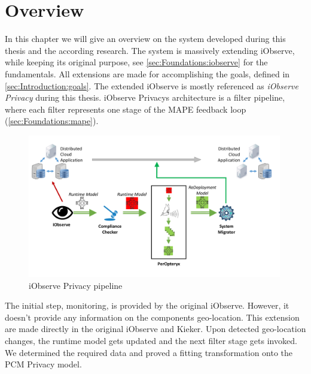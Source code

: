 
\chapter{Overview}
\label{ch:Overview}

In this chapter we will give an overview on the system developed during this thesis and the according research. The system is massively extending iObserve, while keeping its original purpose, see \autoref{sec:Foundations:iobserve} for the fundamentals. All extensions are made for accomplishing the goals, defined in \autoref{sec:Introduction:goals}. The extended iObserve is mostly referenced as \textit{iObserve Privacy} during this thesis. iObserve Privacys architecture is a filter pipeline, where each filter represents one stage of the MAPE feedback loop (\autoref{sec:Foundations:mape}).


\begin{figure}[h]
	\centering
	\includegraphics[width=0.99\textwidth]{pictures/pipeline}
	\caption{iObserve Privacy pipeline}
	\label{fig:pipeline}
\end{figure}

The initial step, monitoring, is provided by the original iObserve. However, it doesn't provide any information on the components geo-location. This extension are made directly in the original iObserve and Kieker. Upon detected geo-location changes, the runtime model gets updated and the next filter stage gets invoked. We determined the required data and proved a fitting transformation onto the PCM Privacy model.


